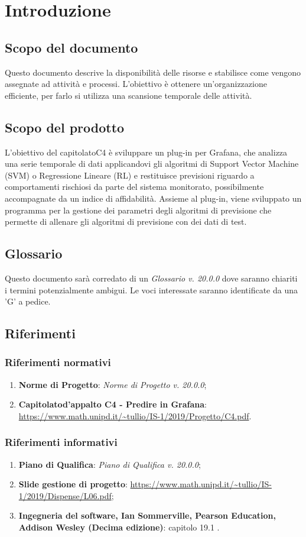 \section{Introduzione}
	\subsection{Scopo del documento}
		Questo documento descrive la disponibilità delle risorse e stabilisce come vengono assegnate ad attività e processi\glo. L'obiettivo è ottenere un'organizzazione efficiente, per farlo si utilizza una scansione temporale delle attività.
	\subsection{Scopo del prodotto}
		L'obiettivo del capitolato\glosp C4 è sviluppare un plug-in per Grafana\glo, che analizza una serie temporale di dati applicandovi gli algoritmi di Support Vector Machine (SVM\glo) o Regressione Lineare (RL\glo) e restituisce previsioni riguardo a comportamenti rischiosi da parte del sistema monitorato, possibilmente accompagnate da un indice di affidabilità. Assieme al plug-in, viene sviluppato un programma per la gestione dei parametri degli algoritmi di previsione che permette di allenare gli algoritmi di previsione con dei dati di test.
	\subsection{Glossario}
		Questo documento sarà corredato di un \textit{Glossario v. 20.0.0} dove saranno chiariti i termini potenzialmente ambigui.
		Le voci interessate saranno identificate da una 'G' a pedice.
	\subsection{Riferimenti}
		\subsubsection{Riferimenti normativi}
			\begin{enumerate}
				\item \textbf{Norme di Progetto}: \textit{Norme di Progetto v. 20.0.0};
				\item \textbf{Capitolato}\glosp \textbf{d'appalto C4 - Predire in Grafana}\glo: \url{https://www.math.unipd.it/~tullio/IS-1/2019/Progetto/C4.pdf}.
			\end{enumerate}
		\subsubsection{Riferimenti informativi}
			\begin{enumerate}
				\item \textbf{Piano di Qualifica}: \textit{Piano di Qualifica v. 20.0.0};
				\item \textbf{Slide gestione di progetto}\glo: \url{https://www.math.unipd.it/~tullio/IS-1/2019/Dispense/L06.pdf};
				\item \textbf{Ingegneria del software, Ian Sommerville, Pearson Education, Addison Wesley (Decima edizione)}: capitolo 19.1 .
			\end{enumerate}
